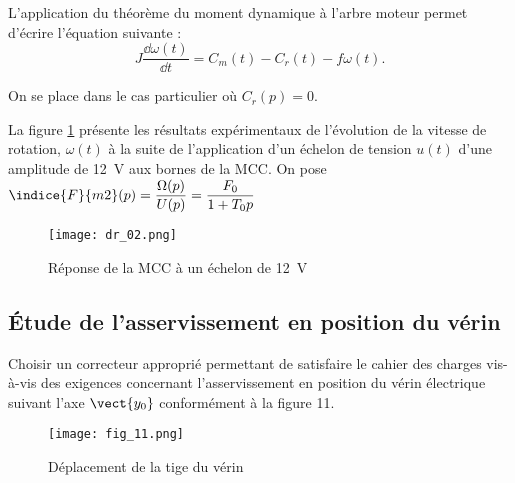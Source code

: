 
L'application du théorème du moment dynamique à l'arbre moteur permet d'écrire l'équation suivante : 
$$
J\dfrac{\dd \omega(t)}{\dd t}  = C_m(t)-C_r(t)-f\omega(t).
$$


On se place dans le cas particulier où $C_r(p) = 0$.



La figure \ref{dr_02} présente les résultats expérimentaux de l’évolution de la vitesse de rotation, $\omega(t)$ à la suite de l’application d’un échelon de tension $u(t)$ d’une amplitude de \SI{12}{V} aux bornes de la MCC. On pose $\indice{F}{m2}(p)=\dfrac{\Omega(p)}{U(p)} = \dfrac{F_0}{1+T_0p}$

\begin{figure}[!h]
\centering
\texttt{[image: dr\_02.png]}
\caption{Réponse de la MCC à un échelon de \SI{12}{V}\label{dr_02}}
\end{figure}



\subsection{Étude de l’asservissement en position du vérin}

\begin{obj}
Choisir un correcteur approprié permettant de satisfaire le cahier des charges vis-à-vis des 
exigences concernant l’asservissement en position du vérin électrique suivant l’axe $\vect{y_0}$
conformément à la figure 11.
\end{obj}

\begin{figure}[!h]
\centering
\texttt{[image: fig\_11.png]}
\caption{Déplacement de la tige du vérin\label{fig_11}}
\end{figure}

